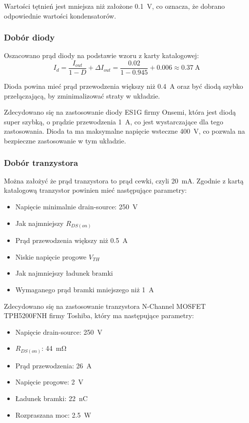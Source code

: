 \documentclass[../../main.tex]{subfiles}
\begin{document}
Wartości tętnień jest mniejsza niż założone \SI{0.1}{\volt}, co oznacza, że dobrano odpowiednie wartości kondensatorów.

\subsubsection{Dobór diody}
Oszacowano prąd diody na podstawie wzoru z karty katalogowej:
\begin{equation}
    I_{d} = \frac{I_{out}}{1-D} + \Delta I_{out} = \frac{0.02}{1-0.945} + 0.006 \approx \SI{0.37}{\ampere}
\end{equation}

Dioda powina mieć prąd przewodzenia większy niż \SI{0.4}{\ampere} oraz być diodą szybko przełączającą, by zminimalizować straty w układzie.

Zdecydowano się na zastosowanie diody ES1G firmy Onsemi, 
która jest diodą super szybką, o prądzie przewodzenia \SI{1}{\ampere}, co jest wystarczające dla tego zastosowania.
Dioda ta ma maksymalne napięcie wsteczne \SI{400}{\volt}, co pozwala na bezpieczne zastosowanie w tym układzie.

\subsubsection{Dobór tranzystora}
Można założyć że prąd tranzystora to prąd cewki, czyli \SI{20}{\milli\ampere}.
Zgodnie z kartą katalogową tranzystor powinien mieć następujące parametry:
\begin{itemize}
    \item Napięcie minimalnie drain-source: \SI{250}{\volt}
    \item Jak najmniejszy $R_{DS(on)}$
    \item Prąd przewodzenia większy niż \SI{0.5}{\ampere}
    \item Niskie napięcie progowe $V_{TH}$
    \item Jak najmniejszy ładunek bramki
    \item Wymaganego prąd bramki mniejszego niż \SI{1}{\ampere}
\end{itemize}

Zdecydowano się na zastosowanie tranzystora N-Channel
MOSFET TPH5200FNH firmy Toshiba, który ma następujące parametry:
\begin{itemize}
    \item Napięcie drain-source: \SI{250}{\volt}
    \item $R_{DS(on)}$: \SI{44}{\milli\ohm}
    \item Prąd przewodzenia: \SI{26}{\ampere}
    \item Napięcie progowe: \SI{2}{\volt}
    \item Ładunek bramki: \SI{22}{\nano\coulomb}
    \item Rozpraszana moc: \SI{2.5}{\watt}
\end{itemize}
\end{document}
